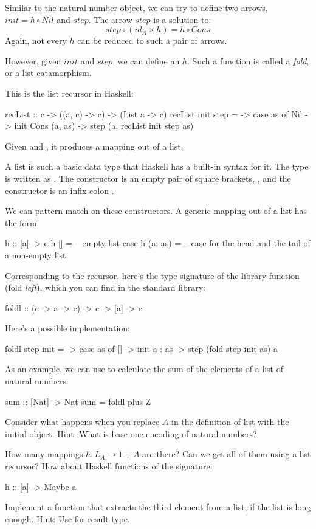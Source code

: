 \documentclass[DaoFP]{subfiles}
\begin{document}
Similar to the natural number object, we can try to define two arrows, $init = h \circ Nil$ and $step$. The arrow $step$ is a solution to:
\[ step \circ (id_A \times h) = h \circ Cons \]
Again, not every $h$ can be reduced to such a pair of arrows.

However, given $init$ and $step$, we can define an $h$. Such a function is called a \emph{fold}, or a list catamorphism. 

This is the list recursor in Haskell:
\begin{haskell}
recList :: c -> ((a, c) -> c) -> (List a -> c)
recList init step = \as ->
  case as of 
    Nil          -> init
    Cons (a, as) -> step (a, recList init step as)
\end{haskell}
Given  and , it produces a mapping out of a list.

A list is such a basic data type that Haskell has a built-in syntax for it. The type  is written as \hask{[a]}. The  constructor is an empty pair of square brackets, \hask{[]}, and the  constructor is an infix colon \hask{:}.

We can pattern match on these constructors. A generic mapping out of a list has the form:
\begin{haskell}
h :: [a] -> c
h []      = -- empty-list case
h (a: as) = -- case for the head and the tail of a non-empty list
\end{haskell}

Corresponding to the recursor, here's the type signature of the library function  (fold \emph{left}), which you can find in the standard library:
\begin{haskell}
foldl :: (c -> a -> c) -> c -> [a] -> c
\end{haskell}
Here's a possible implementation:
\begin{haskell}
foldl step init = \as ->
  case as of
    [] -> init
    a : as -> step (fold step init as) a
\end{haskell}

As an example, we can use  to calculate the sum of the elements of a list of natural numbers:
\begin{haskell}
sum :: [Nat] -> Nat
sum = foldl plus Z
\end{haskell}


\begin{exercise}
Consider what happens when you replace $A$ in the definition of list with the initial object. Hint: What is base-one encoding of natural numbers?
\end{exercise}
\begin{exercise}
How many mappings $h \colon L_A \to 1 + A$ are there? Can we get all of them using a list recursor? How about Haskell functions of the signature:
\begin{haskell}
h :: [a] -> Maybe a
\end{haskell}
\end{exercise}
\begin{exercise}
Implement a function that extracts the third element from a list, if the list is long enough. Hint: Use  for result type.
\end{exercise}
\end{document}
